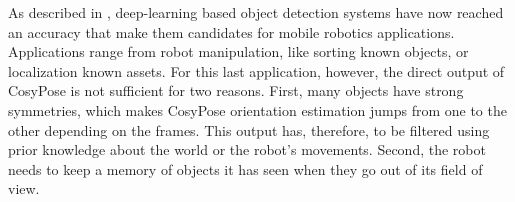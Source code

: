


As described in , deep-learning based object detection systems have now reached an accuracy that make them candidates for mobile robotics applications.
Applications range from robot manipulation, like sorting known objects, or localization \wrt known assets. For this last application, however,
the direct output of CosyPose is not sufficient for two reasons. First, many objects have strong symmetries, which makes CosyPose orientation estimation jumps from one to the other
depending on the frames. This output has, therefore, to be filtered using prior knowledge about the world or the robot's movements. Second, the robot needs to keep
a memory of objects it has seen when they go out of its field of view.

